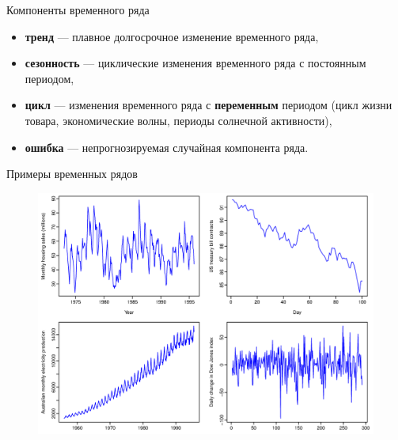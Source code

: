 \begin{frame}{Компоненты временного ряда}

\begin{itemize}
    \item \textbf{тренд} --- плавное долгосрочное изменение временного ряда,
    \item \textbf{сезонность} --- циклические изменения временного ряда с постоянным периодом,
    \item \textbf{цикл} --- изменения временного ряда с \textbf{переменным} периодом (цикл жизни товара, экономические волны, периоды солнечной активности),
    \item \textbf{ошибка} --- непрогнозируемая случайная компонента ряда.
\end{itemize}
\end{frame}
\begin{frame}{Примеры временных рядов}
\begin{figure}
    \centering
    \includegraphics[width=1\linewidth]{lecture_2/fig/ts_components.png}
\end{figure}
\end{frame}
